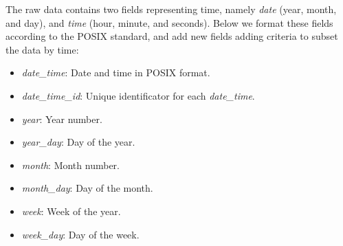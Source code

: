 \documentclass[
  table]{article}
\providecommand{\tightlist}{%
  \setlength{\itemsep}{0pt}\setlength{\parskip}{0pt}}
\begin{document}
The raw data contains two fields representing time, namely \emph{date}
(year, month, and day), and \emph{time} (hour, minute, and seconds).
Below we format these fields according to the POSIX standard, and add
new fields adding criteria to subset the data by time:

\begin{itemize}
\tightlist
\item
  \emph{date\_time}: Date and time in POSIX format.
\item
  \emph{date\_time\_id}: Unique identificator for each
  \emph{date\_time}.
\item
  \emph{year}: Year number.
\item
  \emph{year\_day}: Day of the year.
\item
  \emph{month}: Month number.
\item
  \emph{month\_day}: Day of the month.
\item
  \emph{week}: Week of the year.
\item
  \emph{week\_day}: Day of the week.
\end{itemize}
\end{document}
